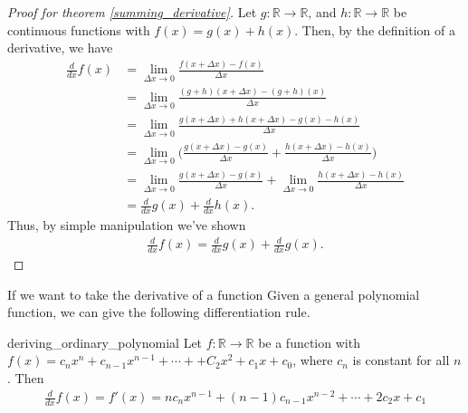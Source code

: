 \begin{proof}[Proof for theorem \ref{summing_derivative}]
	Let $g:\mathbb{R}\rightarrow\mathbb{R}$, and $h:\mathbb{R}\rightarrow\mathbb{R}$ be continuous functions with $f(x)=g(x)+h(x)$. Then, by the definition of a derivative, we have
	\begin{align*}
	\frac{d}{dx}f(x)&=\lim\limits_{\Delta x \rightarrow 0}\frac{f(x+\Delta x)-f(x)}{\Delta x} \\
	&=\lim\limits_{\Delta x \rightarrow 0}\frac{(g+h)(x+\Delta x)-(g+h)(x)}{\Delta x} \\
	&=\lim\limits_{\Delta x \rightarrow 0}\frac{g(x+\Delta x)+h(x+\Delta x)-g(x)-h(x)}{\Delta x} \\
	&=\lim\limits_{\Delta x \rightarrow 0}\bigg(\frac{g(x+\Delta x)-g(x)}{\Delta x}+\frac{h(x+\Delta x)-h(x)}{\Delta x}\bigg) \\
	&=\lim\limits_{\Delta x \rightarrow 0}\frac{g(x+\Delta x)-g(x)}{\Delta x}+\lim\limits_{\Delta x \rightarrow 0}\frac{h(x+\Delta x)-h(x)}{\Delta x} \\
	&= \frac{d}{dx}g(x)+\frac{d}{dx}h(x).
	\end{align*}
	Thus, by simple manipulation we've shown
	\begin{align*}
	\frac{d}{dx}f(x)= \frac{d}{dx}g(x)+\frac{d}{dx}g(x).
	\end{align*}
\end{proof}
If we want to take the derivative of a function
Given a general polynomial function, we can give the following differentiation rule.
\begin{theo}{deriving_ordinary_polynomial}
	Let $f:\mathbb{R}\rightarrow\mathbb{R}$ be a function with $f(x)=c_nx^n+c_{n-1}x^{n-1}+\cdots++C_2x^2+c_1x+c_0$, where $c_n$ is constant for all $n$. Then
	\begin{align*}
	\frac{d}{dx}f(x)=f'(x)=nc_nx^{n-1}+(n-1)c_{n-1}x^{n-2}+\cdots+2c_2x+c_1
	\end{align*}
\end{theo}
